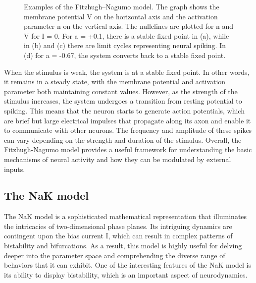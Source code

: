 \documentclass[12pt,a4paper]{report}
\begin{document}
\begin{figure}[H]
    \centering %
    \caption{Examples of the Fitzhugh–Nagumo model. The graph shows the membrane potential V on the horizontal axis and the activation parameter n on the vertical axis. The nullclines are plotted for n and V for I = 0. For a = +0.1, there is a stable fixed point in (a), while in (b) and (c) there are limit cycles representing neural spiking. In (d) for a = -0.67, the system converts back to a stable fixed point. \cite{ref8}} 
\end{figure}
    
When the stimulus is weak, the system is at a stable fixed point. In other words, it remains in a steady state, with the membrane potential and activation parameter both maintaining constant values. However, as the strength of the stimulus increases, the system undergoes a transition from resting potential to spiking. This means that the neuron starts to generate action potentials, which are brief but large electrical impulses that propagate along its axon and enable it to communicate with other neurons. The frequency and amplitude of these spikes can vary depending on the strength and duration of the stimulus\cite{ref8}. Overall, the Fitzhugh-Nagumo model provides a useful framework for understanding the basic mechanisms of neural activity and how they can be modulated by external inputs.
    
\subsection{The NaK model}
The NaK model is a sophisticated mathematical representation that illuminates the intricacies of two-dimensional phase planes. Its intriguing dynamics are contingent upon the bias current I, which can result in complex patterns of bistability and bifurcations. As a result, this model is highly useful for delving deeper into the parameter space and comprehending the diverse range of behaviors that it can exhibit. One of the interesting features of the NaK model is its ability to display bistability, which is an important aspect of neurodynamics. 
\end{document}
